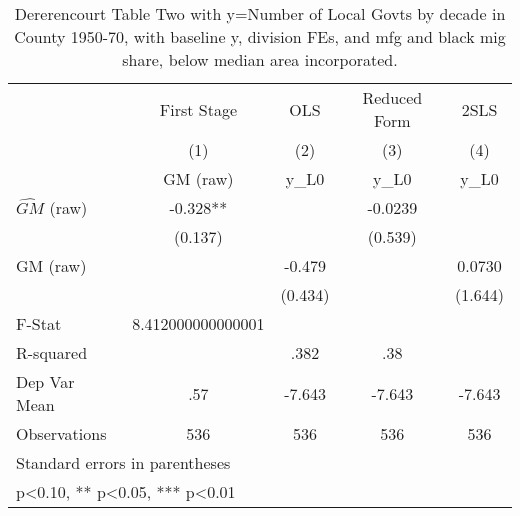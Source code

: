 \begin{table}[htbp]\centering
\def\sym#1{\ifmmode^{#1}\else\(^{#1}\)\fi}
\caption{Dererencourt Table Two with y=Number of Local Govts by decade in County 1950-70, with baseline y, division FEs, and mfg and black mig share, below median area incorporated.}
\begin{tabular}{l*{4}{c}}
\toprule
                    & First Stage   &         OLS   &Reduced Form   &        2SLS   \\
                    &\multicolumn{1}{c}{(1)}&\multicolumn{1}{c}{(2)}&\multicolumn{1}{c}{(3)}&\multicolumn{1}{c}{(4)}\\
                    &\multicolumn{1}{c}{GM  (raw)}&\multicolumn{1}{c}{y\_L0}&\multicolumn{1}{c}{y\_L0}&\multicolumn{1}{c}{y\_L0}\\
\midrule
$\hat{GM}$ (raw)    &      -0.328** &               &     -0.0239   &               \\
                    &     (0.137)   &               &     (0.539)   &               \\
\addlinespace
GM  (raw)           &               &      -0.479   &               &      0.0730   \\
                    &               &     (0.434)   &               &     (1.644)   \\
\midrule
F-Stat              &8.412000000000001   &               &               &               \\
R-squared           &               &        .382   &         .38   &               \\
Dep Var Mean        &         .57   &      -7.643   &      -7.643   &      -7.643   \\
Observations        &         536   &         536   &         536   &         536   \\
\bottomrule
\multicolumn{5}{l}{\footnotesize Standard errors in parentheses}\\
\multicolumn{5}{l}{\footnotesize * p<0.10, ** p<0.05, *** p<0.01}\\
\end{tabular}
\end{table}
